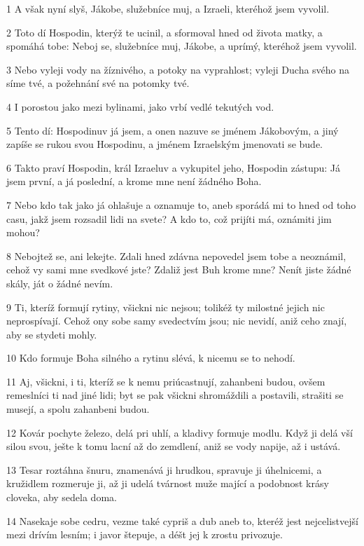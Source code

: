 \par 1 A však nyní slyš, Jákobe, služebníce muj, a Izraeli, kteréhož jsem vyvolil.
\par 2 Toto dí Hospodin, kterýž te ucinil, a sformoval hned od života matky, a spomáhá tobe: Neboj se, služebníce muj, Jákobe, a uprímý, kteréhož jsem vyvolil.
\par 3 Nebo vyleji vody na žíznivého, a potoky na vyprahlost; vyleji Ducha svého na síme tvé, a požehnání své na potomky tvé.
\par 4 I porostou jako mezi bylinami, jako vrbí vedlé tekutých vod.
\par 5 Tento dí: Hospodinuv já jsem, a onen nazuve se jménem Jákobovým, a jiný zapíše se rukou svou Hospodinu, a jménem Izraelským jmenovati se bude.
\par 6 Takto praví Hospodin, král Izraeluv a vykupitel jeho, Hospodin zástupu: Já jsem první, a já poslední, a krome mne není žádného Boha.
\par 7 Nebo kdo tak jako já ohlašuje a oznamuje to, aneb sporádá mi to hned od toho casu, jakž jsem rozsadil lidi na svete? A kdo to, což prijíti má, oznámiti jim mohou?
\par 8 Nebojtež se, ani lekejte. Zdali hned zdávna nepovedel jsem tobe a neoznámil, cehož vy sami mne svedkové jste? Zdaliž jest Buh krome mne? Nenít jiste žádné skály, ját o žádné nevím.
\par 9 Ti, kteríž formují rytiny, všickni nic nejsou; tolikéž ty milostné jejich nic neprospívají. Cehož ony sobe samy svedectvím jsou; nic nevidí, aniž ceho znají, aby se stydeti mohly.
\par 10 Kdo formuje Boha silného a rytinu slévá, k nicemu se to nehodí.
\par 11 Aj, všickni, i ti, kteríž se k nemu priúcastnují, zahanbeni budou, ovšem remeslníci ti nad jiné lidi; byt se pak všickni shromáždili a postavili, strašiti se musejí, a spolu zahanbeni budou.
\par 12 Kovár pochyte železo, delá pri uhlí, a kladivy formuje modlu. Když ji delá vší silou svou, ješte k tomu lacní až do zemdlení, aniž se vody napije, až i ustává.
\par 13 Tesar roztáhna šnuru, znamenává ji hrudkou, spravuje ji úhelnicemi, a kružidlem rozmeruje ji, až ji udelá tvárnost muže mající a podobnost krásy cloveka, aby sedela doma.
\par 14 Nasekaje sobe cedru, vezme také cypriš a dub aneb to, kteréž jest nejcelistvejší mezi drívím lesním; i javor štepuje, a déšt jej k zrostu privozuje.
